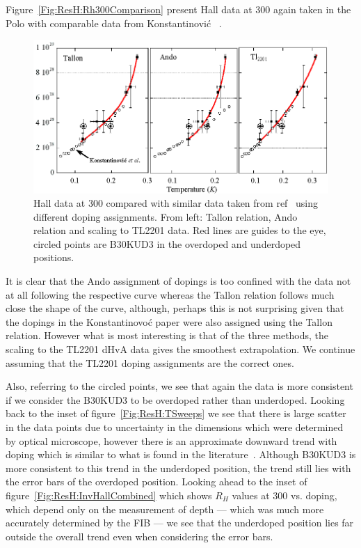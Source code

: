 Figure~\ref{Fig:ResH:Rh300Comparison} present Hall data at \unit{300}{\kelvin} again taken in the Polo with comparable data from Konstantinovi\'c \etal~\cite{Konstantinovic2001}.
\begin{figure}[htbp]
    \begin{center}
        \includegraphics[scale=1.0]{Chapter-HallBSCO/Figures/Rh300Comparison/Rh300Comparison}
        \caption{Hall data at \unit{300}{\kelvin} compared with similar data taken from ref~\cite{Konstantinovic2001} using different doping assignments. From left: Tallon relation, Ando relation and scaling to \ac{TL2201} data. Red lines are guides to the eye, circled points are B30KUD3 in the overdoped and underdoped positions.}
        \label{Fig:Rh300Comparison}
    \end{center}
\end{figure}
It is clear that the Ando assignment of dopings is too confined with the data not at all following the respective curve whereas the Tallon relation follows much close the shape of the curve, although, perhaps this is not surprising given that the dopings in the Konstantinovo\'c paper were also assigned using the Tallon relation. However what is most interesting is that of the three methods, the scaling to the \ac{TL2201} \ac{dHvA} data gives the smoothest extrapolation. We continue assuming that the \ac{TL2201} doping assignments are the correct ones.

Also, referring to the circled points, we see that again the data is more consistent if we consider the B30KUD3 to be overdoped rather than underdoped. Looking back to the inset of figure~\ref{Fig:ResH:TSweeps} we see that there is large scatter in the data points due to uncertainty in the dimensions which were determined by optical microscope, however there is an approximate downward trend with doping which is similar to what is found in the literature~\cite{Ando2000, Ando1999, Konstantinovic2001, Ono2000}. Although B30KUD3 is more consistent to this trend in the underdoped position, the trend still lies with the error bars of the overdoped position. Looking ahead to the inset of figure~\ref{Fig:ResH:InvHallCombined} which shows $R_H$ values at \unit{300}{\kelvin} vs. doping, which depend only on the measurement of depth --- which was much more accurately determined by the \ac{FIB} --- we see that the underdoped position lies far outside the overall trend even when considering the error bars. 

